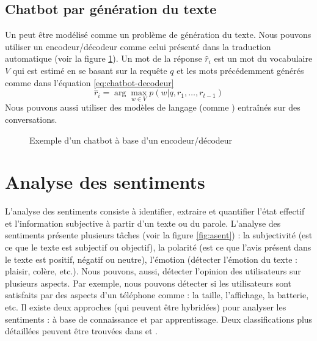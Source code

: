 \documentclass{KodeBook}
\begin{document}
\subsection{Chatbot par génération du texte}

Un  peut être modélisé comme un problème de génération du texte. 
Nous pouvons utiliser un encodeur/décodeur comme celui présenté dans la traduction automatique (voir la figure \ref{fig:chatbot-encdec}).
Un mot de la réponse $\hat{r}_i$ est un mot du vocabulaire $V$ qui est estimé en se basant sur la requête $q$ et les mots précédemment générés comme dans l'équation \ref{eq:chatbot-decodeur}
\begin{equation}\label{eq:chatbot-decodeur}
\hat{r}_i = \arg\max_{w \in V} p(w| q, r_1, \ldots, r_{t-1})
\end{equation}
Nous pouvons aussi utiliser des modèles de langage (comme ) entraînés sur des conversations.

\begin{figure}[!ht]
	\centering
	\caption[Exemple d'un chatbot à base d'un encodeur/décodeur]{Exemple d'un chatbot à base d'un encodeur/décodeur \cite{2020-jurafsky-martin}}
	\label{fig:chatbot-encdec}
\end{figure}


\section{Analyse des sentiments}

L'analyse des sentiments consiste à identifier, extraire et quantifier l'état effectif et l'information subjective à partir d'un texte ou du parole.
L'analyse des sentiments présente plusieurs tâches (voir la figure \ref{fig:asent}) : la subjectivité (est ce que le texte est subjectif ou objectif), la polarité (est ce que l'avis présent dans le texte est positif, négatif ou neutre), l'émotion (détecter l'émotion du texte : plaisir, colère, etc.). 
Nous pouvons, aussi, détecter l'opinion des utilisateurs sur plusieurs aspects. 
Par exemple, nous pouvons détecter si les utilisateurs sont satisfaits par des aspects d'un téléphone comme : la taille, l'affichage, la batterie, etc. 
Il existe deux approches (qui peuvent être hybridées) pour analyser les sentiments : à base de connaissance et par apprentissage. 
Deux classifications plus détaillées peuvent être trouvées dans \cite{19-yue-al} et \cite{14-medhat-al}.
\end{document}
